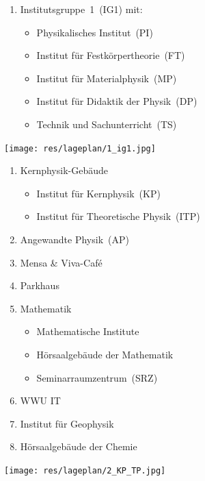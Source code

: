 {\large\RaggedRight
\begin{minipage}{0.54\textwidth}
	\begin{enumerate}[labelsep=*, leftmargin=1.2em, series=lageplan]
		\item Institutsgruppe~1~(IG1) mit:
		\begin{itemize}
			\item Physikalisches Institut~(PI)
			\item Institut für Festkörpertheorie~(FT)
			\item Institut für Materialphysik~(MP)
			\item Institut für Didaktik der Physik~(DP)
			\item Technik und Sachunterricht~(TS)
		\end{itemize}
	\end{enumerate}
\end{minipage}
\hfill
\begin{minipage}{0.45\textwidth}
	\centering
	\texttt{[image: res/lageplan/1\_ig1.jpg]}
\end{minipage}

\clearpage

\begin{minipage}{0.54\textwidth}
	\begin{enumerate}[resume*=lageplan]
		\item Kernphysik-Gebäude
		\begin{itemize}
			\item Institut für Kernphysik~(KP)
			\item Institut für Theoretische Physik~(ITP)
		\end{itemize}
		\item Angewandte Physik~(AP)
		\item Mensa \& Viva-Café
		\item Parkhaus
		\item Mathematik
		\begin{itemize}
			\item Mathematische Institute
			\item Hörsaalgebäude der Mathematik
			\item Seminarraumzentrum~(SRZ)
		\end{itemize}
		\item WWU IT
		\item Institut für Geophysik
		\item Hörsaalgebäude der Chemie
	\end{enumerate}
\end{minipage}
\hfill
\begin{minipage}{0.45\textwidth}
	\vspace{-0.5cm}
	\centering
	\texttt{[image: res/lageplan/2\_KP\_TP.jpg]}
\end{minipage}

}
